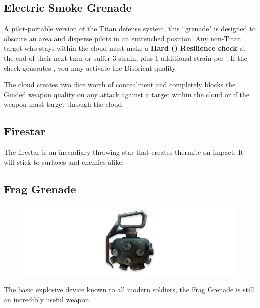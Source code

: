 \documentclass[9pt, openany]{extbook}
\begin{document}
\subsection{Electric Smoke Grenade}
A pilot-portable version of the Titan defense system, this ``grenade" is designed to obscure an area and disperse pilots in an entrenched position. Any non-Titan target who stays within the cloud must make a \textbf{Hard (\DifficultyDie\DifficultyDie\DifficultyDie) Resilience check} at the end of their next turn or suffer 3 strain, plus 1 additional strain per \Failure. If the check generates \Threat\Threat, you may activate the Disorient quality.

The cloud creates two dice worth of concealment and completely blocks the Guided weapon quality on any attack against a target within the cloud or if the weapon must target through the cloud.

\subsection{Firestar}
The firestar is an incendiary throwing star that creates thermite on impact. It will stick to surfaces and enemies alike.


\subsection{Frag Grenade}
\begin{figure}
\vspace*{-2em}
\includegraphics[width=\linewidth]{FragGrenade}
\end{figure}

The basic explosive device known to all modern soldiers, the Frag Grenade is still an incredibly useful weapon.
\end{document}
